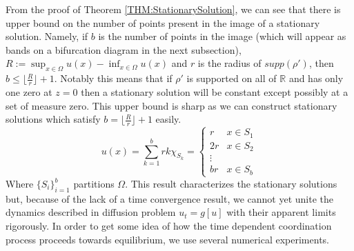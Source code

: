 \documentclass[aps,
preprint,
groupedaddress,
showkeys,
amsmath]{revtex4-2}
\begin{document}
    From the proof of Theorem \ref{THM:StationarySolution}, we can see that there is upper bound on the number of points present in the image of a stationary solution. Namely, if $b$ is the number of points in the image (which will appear as bands on a bifurcation diagram in the next subsection), $R:=\sup_{x\in\Omega}u(x)-\inf_{x\in\Omega}u(x)$ and $r$ is the radius of $supp(\rho')$, then $b\leq\lfloor\frac{R}{r}\rfloor+1$. Notably this means that if $\rho'$ is supported on all of $\mathbb{R}$ and has only one zero at $z=0$ then a stationary solution will be constant except possibly at a set of measure zero. This upper bound is sharp as we can construct stationary solutions which satisfy $b=\lfloor\frac{R}{r}\rfloor+1$ easily.
    \[u(x)=\sum_{k=1}^{b}rk\chi_{S_k}=\begin{cases}
        r&x\in S_1\\
        2r&x\in S_2\\
        \vdots&\\
        br&x\in S_{b}
    \end{cases}\]
    Where $\{S_i\}_{i=1}^b$ partitions $\Omega$. This result characterizes the stationary solutions but, because of the lack of a time convergence result, we cannot yet unite the dynamics described in diffusion problem $u_t=g[u]$ with their apparent limits rigorously. In order to get some idea of how the time dependent coordination process proceeds towards equilibrium, we use several numerical experiments. 
\end{document}
